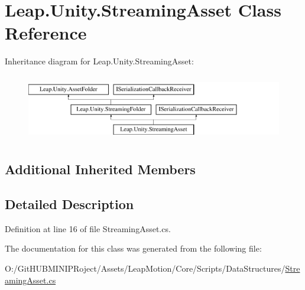 \hypertarget{class_leap_1_1_unity_1_1_streaming_asset}{}\section{Leap.\+Unity.\+Streaming\+Asset Class Reference}
\label{class_leap_1_1_unity_1_1_streaming_asset}
Inheritance diagram for Leap.\+Unity.\+Streaming\+Asset\+:\begin{figure}[H]
\begin{center}
\leavevmode
\includegraphics[height=2.916667cm]{class_leap_1_1_unity_1_1_streaming_asset}
\end{center}
\end{figure}
\subsection*{Additional Inherited Members}


\subsection{Detailed Description}


Definition at line 16 of file Streaming\+Asset.\+cs.



The documentation for this class was generated from the following file\+:\begin{DoxyCompactItemize}
\item 
O\+:/\+Git\+H\+U\+B\+M\+I\+N\+I\+P\+Roject/\+Assets/\+Leap\+Motion/\+Core/\+Scripts/\+Data\+Structures/\mbox{\hyperlink{_streaming_asset_8cs}{Streaming\+Asset.\+cs}}\end{DoxyCompactItemize}

